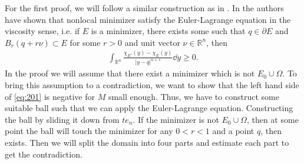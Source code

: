 For the first proof, we will follow a similar construction as in
\cite{dipierro2020disconnectedness}.\newline
In \cite{caffarelli2009nonlocal} the authors have shown that nonlocal minimizer satisfy
the Euler-Lagrange equation in the viscosity sense, i.e. if \( E \) is a minimizer, there
exists some such that \( q \in \partial E \) and \( B_r (q+r \nu) \subset E \) for some \(
r > 0 \) and unit vector \( \nu \in \mathbb{R}^n \), then
\begin{gather}
	\int_{\mathbb{R}^n} \frac{\chi_{E^c}(y)-\chi_E (y)}{\lvert y-q\rvert^{n+s}} \dd{y} \geq 0. \label{eq:201}
\end{gather}
In the proof we will assume that there exist a minimizer which is not \( E_0 \cup \Omega
\). To bring this assumption to a contradiction, we want to show that the left hand side
of \cref{eq:201} is negative for \( M \) small enough. Thus, we have to construct some
suitable ball such that we can apply the Euler-Lagrange equation. Constructing the ball by
sliding it down from \( t e_n \). If the minimizer is not \( E_0 \cup \Omega \), then at
some point the ball will touch the minimizer for any \( 0 < r < 1 \) and a point \( q \),
then exists. Then we will split the domain into four parts and estimate each part to get
the contradiction.

